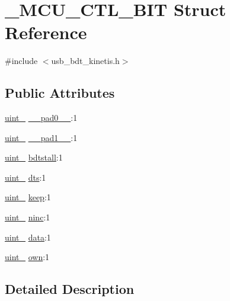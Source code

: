 \hypertarget{struct___m_c_u___c_t_l___b_i_t}{}\section{\+\_\+\+M\+C\+U\+\_\+\+C\+T\+L\+\_\+\+B\+IT Struct Reference}
\label{struct___m_c_u___c_t_l___b_i_t}


{\ttfamily \#include $<$usb\+\_\+bdt\+\_\+kinetis.\+h$>$}

\subsection*{Public Attributes}
\begin{DoxyCompactItemize}
\item 
\hyperlink{types_8h_ad3209046c23f739a81581c10a4be7d92}{uint\+\_} \hyperlink{struct___m_c_u___c_t_l___b_i_t_a4207c6b8e00a06b5e7da5f66109350d5}{\+\_\+\+\_\+pad0\+\_\+\+\_\+}\+:1
\item 
\hyperlink{types_8h_ad3209046c23f739a81581c10a4be7d92}{uint\+\_} \hyperlink{struct___m_c_u___c_t_l___b_i_t_ab1ce0a4a2a37f1f2e440d27b7edcabb0}{\+\_\+\+\_\+pad1\+\_\+\+\_\+}\+:1
\item 
\hyperlink{types_8h_ad3209046c23f739a81581c10a4be7d92}{uint\+\_} \hyperlink{struct___m_c_u___c_t_l___b_i_t_a369153602b4e76acf326947fb83a119a}{bdtstall}\+:1
\item 
\hyperlink{types_8h_ad3209046c23f739a81581c10a4be7d92}{uint\+\_} \hyperlink{struct___m_c_u___c_t_l___b_i_t_aca315ff6e97471d47fd597381d4c5a79}{dts}\+:1
\item 
\hyperlink{types_8h_ad3209046c23f739a81581c10a4be7d92}{uint\+\_} \hyperlink{struct___m_c_u___c_t_l___b_i_t_a33349a215ae8efc8466b3ee1f4e7926c}{keep}\+:1
\item 
\hyperlink{types_8h_ad3209046c23f739a81581c10a4be7d92}{uint\+\_} \hyperlink{struct___m_c_u___c_t_l___b_i_t_ab3ac5cbc80ff22c5aecfa93984fc683b}{ninc}\+:1
\item 
\hyperlink{types_8h_ad3209046c23f739a81581c10a4be7d92}{uint\+\_} \hyperlink{struct___m_c_u___c_t_l___b_i_t_aa6b0dd473672cd54570ffd343d767427}{data}\+:1
\item 
\hyperlink{types_8h_ad3209046c23f739a81581c10a4be7d92}{uint\+\_} \hyperlink{struct___m_c_u___c_t_l___b_i_t_a6c2ea9a559539c51000a7c130c3fbbc8}{own}\+:1
\end{DoxyCompactItemize}


\subsection{Detailed Description}


